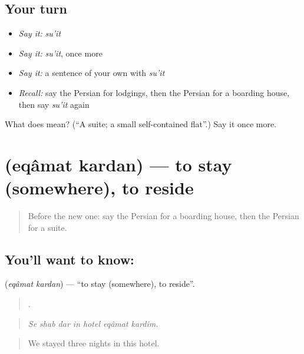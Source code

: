 \subsection*{Your turn}
\begin{itemize}
\raggedright
  \item \emph{Say it:} \emph{su'it}
  \item \emph{Say it:} \emph{su'it}, once more
  \item \emph{Say it:} a sentence of your own with \emph{su'it}
  \item \emph{Recall:} say the Persian for lodgings, then the Persian for a boarding house, then say \emph{su'it} again
\end{itemize}

\begin{tcolorbox}[breakable,colback=teal!4,colframe=teal!35!black,title={Before you move on}]
What does  mean? (\textquotedblleft{}A suite; a small self-contained flat\textquotedblright{}.) Say it once more.
\end{tcolorbox}
\section[\texorpdfstring{\fa{اقامت} \fa{کردن} (eqâmat kardan)}{اقامت کردن (eqâmat kardan)}]{  (eqâmat kardan) — to stay (somewhere), to reside}

\label{lesson:FA-C437-eqamat-kardan}



\begin{quote}
Before the new one: say the Persian for a boarding house, then the Persian for a suite.
\end{quote}

\subsection*{You'll want to know:  }
\textbf{ } (\emph{eqâmat kardan}) — \textquotedblleft{}to stay (somewhere), to reside\textquotedblright{}.

\begin{quote}
      .
\end{quote}

\begin{quote}
\emph{Se shab dar in hotel eqâmat kardim.}
\end{quote}

\begin{quote}
We stayed three nights in this hotel.
\end{quote}

